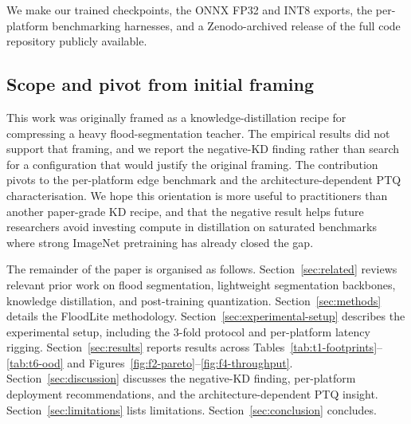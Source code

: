 We make our trained checkpoints, the ONNX FP32 and INT8 exports, the per-platform benchmarking harnesses, and a Zenodo-archived release of the full code repository publicly available.

\subsection{Scope and pivot from initial framing}
\label{sec:scope-pivot}

This work was originally framed as a knowledge-distillation recipe for compressing a heavy flood-segmentation teacher. The empirical results did not support that framing, and we report the negative-KD finding rather than search for a configuration that would justify the original framing. The contribution pivots to the per-platform edge benchmark and the architecture-dependent PTQ characterisation. We hope this orientation is more useful to practitioners than another paper-grade KD recipe, and that the negative result helps future researchers avoid investing compute in distillation on saturated benchmarks where strong ImageNet pretraining has already closed the gap.

The remainder of the paper is organised as follows. Section~\ref{sec:related} reviews relevant prior work on flood segmentation, lightweight segmentation backbones, knowledge distillation, and post-training quantization. Section~\ref{sec:methods} details the FloodLite methodology. Section~\ref{sec:experimental-setup} describes the experimental setup, including the 3-fold protocol and per-platform latency rigging. Section~\ref{sec:results} reports results across Tables~\ref{tab:t1-footprints}--\ref{tab:t6-ood} and Figures~\ref{fig:f2-pareto}--\ref{fig:f4-throughput}. Section~\ref{sec:discussion} discusses the negative-KD finding, per-platform deployment recommendations, and the architecture-dependent PTQ insight. Section~\ref{sec:limitations} lists limitations. Section~\ref{sec:conclusion} concludes.
